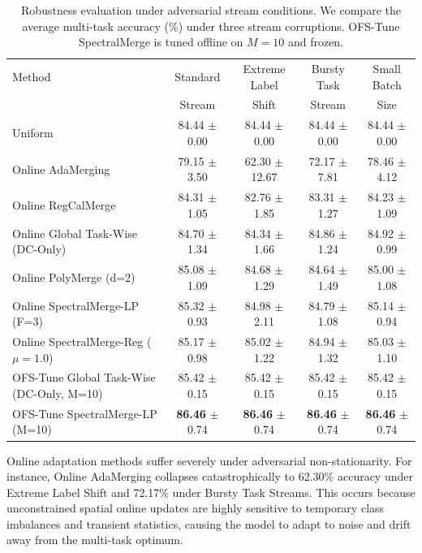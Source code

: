 \begin{table}[t]
\caption{Robustness evaluation under adversarial stream conditions. We compare the average multi-task accuracy (\%) under three stream corruptions. OFS-Tune SpectralMerge is tuned offline on $M=10$ and frozen.}
\label{tab:adversarial_eval}
\vskip 0.15in
\begin{center}
\begin{small}
\begin{sc}
\begin{tabular}{lcccc}
\toprule
Method & Standard & Extreme Label & Bursty Task & Small Batch \\
 & Stream & Shift & Stream & Size \\
\midrule
Uniform & 84.44 $\pm$ 0.00 & 84.44 $\pm$ 0.00 & 84.44 $\pm$ 0.00 & 84.44 $\pm$ 0.00 \\
Online AdaMerging & 79.15 $\pm$ 3.50 & 62.30 $\pm$ 12.67 & 72.17 $\pm$ 7.81 & 78.46 $\pm$ 4.12 \\
Online RegCalMerge & 84.31 $\pm$ 1.05 & 82.76 $\pm$ 1.85 & 83.31 $\pm$ 1.27 & 84.23 $\pm$ 1.09 \\
Online Global Task-Wise (DC-Only) & 84.70 $\pm$ 1.34 & 84.34 $\pm$ 1.66 & 84.86 $\pm$ 1.24 & 84.92 $\pm$ 0.99 \\
Online PolyMerge (d=2) & 85.08 $\pm$ 1.09 & 84.68 $\pm$ 1.29 & 84.64 $\pm$ 1.49 & 85.00 $\pm$ 1.08 \\
\midrule
Online SpectralMerge-LP (F=3) & 85.32 $\pm$ 0.93 & 84.98 $\pm$ 2.11 & 84.79 $\pm$ 1.08 & 85.14 $\pm$ 0.94 \\
Online SpectralMerge-Reg ($\mu=1.0$) & 85.17 $\pm$ 0.98 & 85.02 $\pm$ 1.22 & 84.94 $\pm$ 1.32 & 85.03 $\pm$ 1.10 \\
OFS-Tune Global Task-Wise (DC-Only, M=10) & 85.42 $\pm$ 0.15 & 85.42 $\pm$ 0.15 & 85.42 $\pm$ 0.15 & 85.42 $\pm$ 0.15 \\
OFS-Tune SpectralMerge-LP (M=10) & \textbf{86.46} $\pm$ 0.74 & \textbf{86.46} $\pm$ 0.74 & \textbf{86.46} $\pm$ 0.74 & \textbf{86.46} $\pm$ 0.74 \\
\bottomrule
\end{tabular}
\end{sc}
\end{small}
\end{center}
\vskip -0.1in
\end{table}

Online adaptation methods suffer severely under adversarial non-stationarity. For instance, Online AdaMerging collapses catastrophically to 62.30\% accuracy under Extreme Label Shift and 72.17\% under Bursty Task Streams. This occurs because unconstrained spatial online updates are highly sensitive to temporary class imbalances and transient statistics, causing the model to adapt to noise and drift away from the multi-task optimum. 

